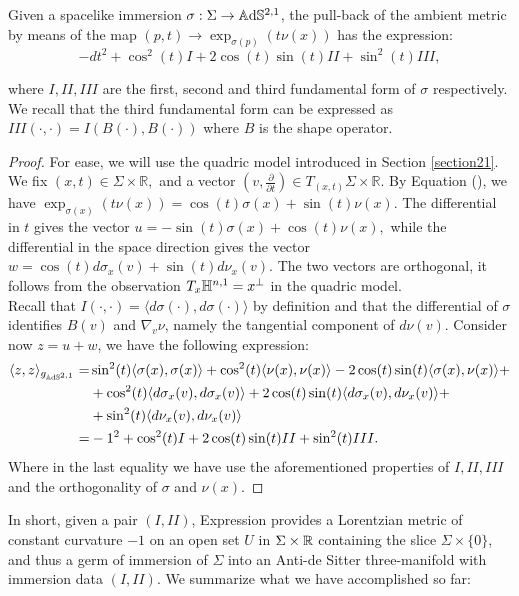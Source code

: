 \begin{lemma}
    Given a spacelike immersion $\sigma:\Sigma\to\mathbb{A}\mathrm{d}\mathbb{S}^{2,1}$, the pull-back of the ambient metric by means of the map $(p,t)\to\exp_{\sigma(p)}(t\nu(x))$ has the expression: 
\begin{equation}\label{64}
    -dt^{2}+\cos^2(t)I+2\cos(t)\sin(t)II+\sin^2(t)III, 
\end{equation}

where $I,II,III$ are the first, second and third fundamental form of $\sigma$ respectively. We recall that the third fundamental form can be expressed as $III(\cdot,\cdot)=I(B(\cdot),B(\cdot))$ where $B$ is the shape operator.
\end{lemma}
\begin{proof}
    For ease, we will use the quadric model introduced in Section \ref{section21}. We fix $(x,t)\in\Sigma\times\mathbb{R},$ and a vector $(v,\frac{\partial}{\partial t})\in T_{(x,t)}\Sigma\times\mathbb{R}.$ By Equation (), we have $\exp_{\sigma(x)}(t\nu(x))=\cos(t)\sigma(x)+\sin(t)\nu(x)$. The differential in $t$ gives the vector $u=-\sin(t)\sigma(x)+\cos(t)\nu(x),$ while the differential in the space direction gives the vector $w=\cos(t)d\sigma_x(v)+\sin(t)d\nu_x(v)$. The two vectors are orthogonal, it follows from the observation $T_x\mathbb{H}^{n,1}=x^\perp$ in the quadric model.\\     
    Recall that $I(\cdot,\cdot)=\langle d\sigma(\cdot),d\sigma(\cdot)\rangle$ by definition and that the differential of $\sigma$ identifies $B(v)$ and $\nabla_v\nu$, namely the tangential component of $d\nu(v)$. Consider now $z=u+w$, we have the following expression:
    \begin{align*}
        \langle z,z\rangle_{g_{\mathbb{A}\mathrm{d}\mathbb{S}^{2,1}}}=&\sin^{2}(t)\langle \sigma(x),\sigma(x)\rangle+\cos^{2}(t)\langle \nu(x),\nu(x)\rangle-2\cos(t)\sin(t)\langle \sigma(x),\nu(x)\rangle+\\&+\cos^2(t)\langle d\sigma_{x}(v),d\sigma_{x}(v)\rangle+2\cos(t)\sin(t)\langle d\sigma_{x}(v),d\nu_x(v)\rangle+\\&+\sin^2(t)\langle d\nu_x(v),d\nu_x(v)\rangle \\
        =&-1^{2}+\cos^2(t)I+2\cos(t)\sin(t)II+\sin^{2}(t)III. 
    \end{align*}
    Where in the last equality we have use the aforementioned properties of $I,II,III$ and the orthogonality of $\sigma$ and $\nu(x).$
\end{proof}

In short, given a pair $(I,II)$, Expression  provides a Lorentzian metric of constant curvature $-1$ on an open set $U$ in $\Sigma\times\mathbb{R}$ containing the slice $\Sigma\times\{0\}$, and thus a germ of immersion of $\Sigma$ into an Anti-de Sitter three-manifold with immersion data $(I,II)$. We summarize what we have accomplished so far: 

